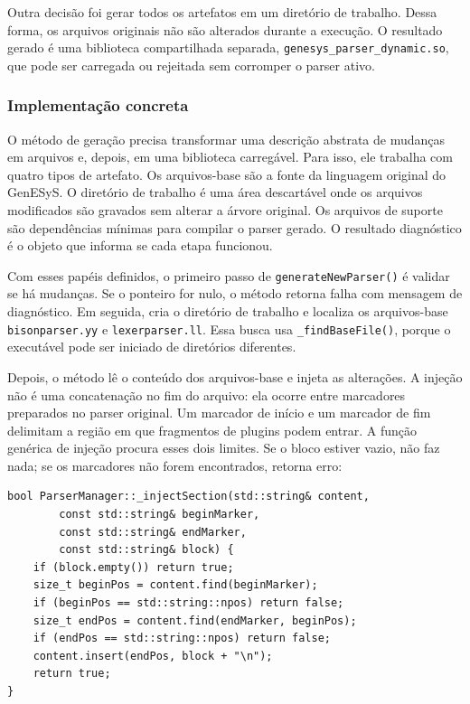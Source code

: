 \documentclass[12pt,a4paper]{article}
\begin{document}
Outra decis\~ao foi gerar todos os artefatos em um diret\'orio de trabalho. Dessa forma, os arquivos originais n\~ao s\~ao alterados durante a execu\c{c}\~ao. O resultado gerado \'e uma biblioteca compartilhada separada, \texttt{genesys\_parser\_dynamic.so}, que pode ser carregada ou rejeitada sem corromper o parser ativo.

\subsubsection{Implementa\c{c}\~ao concreta}

O m\'etodo de gera\c{c}\~ao precisa transformar uma descri\c{c}\~ao abstrata de mudan\c{c}as em arquivos e, depois, em uma biblioteca carreg\'avel. Para isso, ele trabalha com quatro tipos de artefato. Os arquivos-base s\~ao a fonte da linguagem original do GenESyS. O diret\'orio de trabalho \'e uma \'area descart\'avel onde os arquivos modificados s\~ao gravados sem alterar a \'arvore original. Os arquivos de suporte s\~ao depend\^encias m\'inimas para compilar o parser gerado. O resultado diagn\'ostico \'e o objeto que informa se cada etapa funcionou.

Com esses pap\'eis definidos, o primeiro passo de \texttt{generateNewParser()} \'e validar se h\'a mudan\c{c}as. Se o ponteiro for nulo, o m\'etodo retorna falha com mensagem de diagn\'ostico. Em seguida, cria o diret\'orio de trabalho e localiza os arquivos-base \texttt{bisonparser.yy} e \texttt{lexerparser.ll}. Essa busca usa \texttt{\_findBaseFile()}, porque o execut\'avel pode ser iniciado de diret\'orios diferentes.

Depois, o m\'etodo l\^e o conte\'udo dos arquivos-base e injeta as altera\c{c}\~oes. A inje\c{c}\~ao n\~ao \'e uma concatena\c{c}\~ao no fim do arquivo: ela ocorre entre marcadores preparados no parser original. Um marcador de in\'icio e um marcador de fim delimitam a regi\~ao em que fragmentos de plugins podem entrar. A fun\c{c}\~ao gen\'erica de inje\c{c}\~ao procura esses dois limites. Se o bloco estiver vazio, n\~ao faz nada; se os marcadores n\~ao forem encontrados, retorna erro:

\begin{lstlisting}[style=cppsmall]
bool ParserManager::_injectSection(std::string& content,
        const std::string& beginMarker,
        const std::string& endMarker,
        const std::string& block) {
    if (block.empty()) return true;
    size_t beginPos = content.find(beginMarker);
    if (beginPos == std::string::npos) return false;
    size_t endPos = content.find(endMarker, beginPos);
    if (endPos == std::string::npos) return false;
    content.insert(endPos, block + "\n");
    return true;
}
\end{lstlisting}
\end{document}
